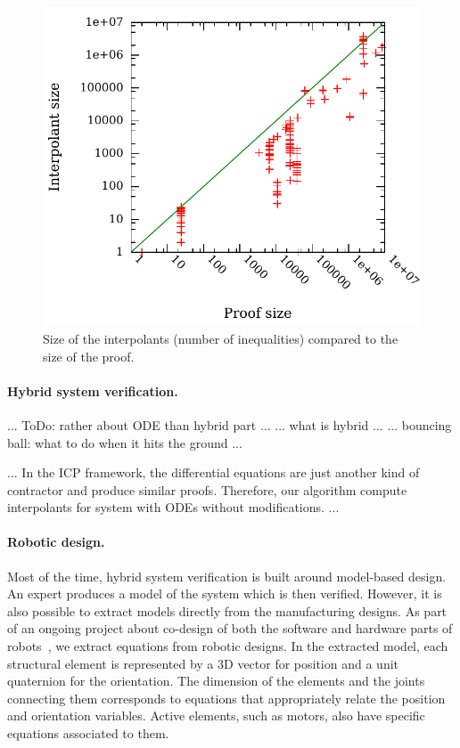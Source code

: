 \begin{figure}
\centering
\includegraphics[scale=0.6]{img/itpsize2.pdf}
\caption{
    Size of the interpolants (number of inequalities) compared to the size of the proof.
}
\label{fig:flyspeck}
\end{figure}


\paragraph{Hybrid system verification.}
... ToDo: rather about ODE than hybrid part ...
... what is hybrid ...
... bouncing ball: what to do when it hits the ground ...

...
In the ICP framework, the differential equations are just another kind of contractor and produce similar proofs.
Therefore, our algorithm compute interpolants for system with ODEs without modifications.
...


\paragraph{Robotic design.}
Most of the time, hybrid system verification is built around model-based design.
An expert produces a model of the system which is then verified.
However, it is also possible to extract models directly from the manufacturing designs.
As part of an ongoing project about co-design of both the software and hardware parts of robots~\cite{react}, we extract equations from robotic designs.
In the extracted model, each structural element is represented by a 3D vector for position and a unit quaternion for the orientation.
The dimension of the elements and the joints connecting them corresponds to equations that appropriately relate the position and orientation variables.
Active elements, such as motors, also have specific equations associated to them.

